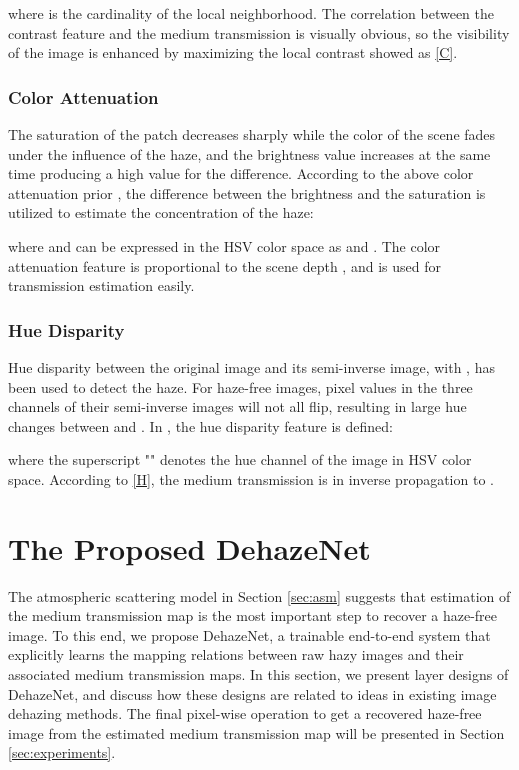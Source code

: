 \documentclass[journal]{IEEEtran}
\begin{document}
where  is the cardinality of the local neighborhood. The correlation between the contrast feature and the medium transmission  is visually obvious, so the visibility of the image is enhanced by maximizing the local contrast showed as \eqref{C}.

\subsubsection{Color Attenuation}
 The saturation  of the patch decreases sharply while the color of the scene fades under the influence of the haze, and the brightness value  increases at the same time producing a high value for the difference. According to the above color attenuation prior \cite{cap}, the difference between the brightness and the saturation is utilized to estimate the concentration of the haze:

where  and  can be expressed in the HSV color space as  and . The color attenuation feature is proportional to the scene depth , and is used for transmission estimation easily.

\subsubsection{Hue Disparity}
Hue disparity between the original image  and its semi-inverse image,  with , has been used to detect the haze. For haze-free images, pixel values in the three channels of their semi-inverse images will not all flip, resulting in large hue changes between  and . In \cite{semiinverse}, the hue disparity feature is defined:

where the superscript "" denotes the hue channel of the image in HSV color space. According to \eqref{H}, the medium transmission  is in inverse propagation to .

\section{The Proposed DehazeNet}\label{sec:dehazecnn}

The atmospheric scattering model in Section \ref{sec:asm} suggests that estimation of the medium transmission map is the most important step to recover a haze-free image. To this end, we propose DehazeNet, a trainable end-to-end system that explicitly learns the mapping relations between raw hazy images and their associated medium transmission maps. In this section, we present layer designs of DehazeNet, and discuss how these designs are related to ideas in existing image dehazing methods.  The final pixel-wise operation to get a recovered haze-free image from the estimated medium transmission map will be presented in Section \ref{sec:experiments}.
\end{document}
